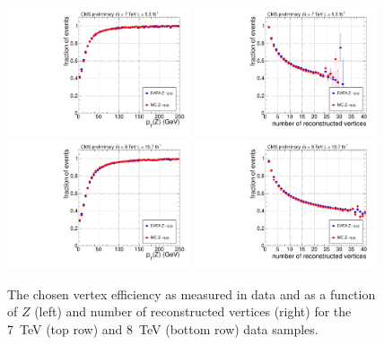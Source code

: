 \begin{figure}
  \includegraphics[width=0.48\textwidth]{analysis_comps/plots/vertex_bdt_efficiency_pt_7TeV.pdf}
  \includegraphics[width=0.48\textwidth]{analysis_comps/plots/vertex_bdt_efficiency_nvtx_7TeV.pdf} \\
  \includegraphics[width=0.48\textwidth]{analysis_comps/plots/vertex_bdt_efficiency_pt_8TeV.pdf}
  \includegraphics[width=0.48\textwidth]{analysis_comps/plots/vertex_bdt_efficiency_nvtx_8TeV.pdf} 
  \caption{The chosen vertex efficiency as measured in \Zmumu data and \MC as a function of $Z$ \pT (left) and number of reconstructed vertices (right) for the 7~TeV (top row) and 8~TeV (bottom row) data samples.}
  \label{fig:vertex_bdt_efficiency}
\end{figure}

